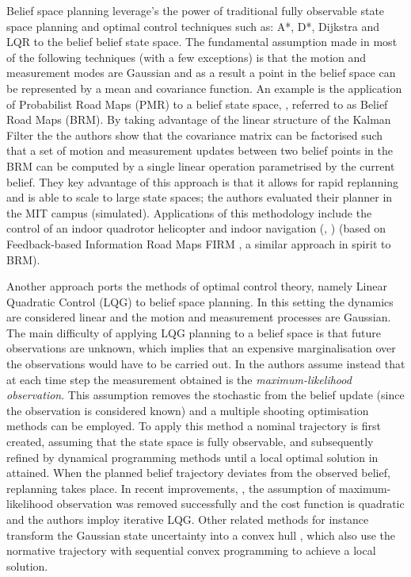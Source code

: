 Belief space planning leverage's the power of traditional fully observable state space 
planning and optimal control techniques such as: A*, D*,  Dijkstra and LQR to the belief belief state space. 
The fundamental assumption made in most of the following techniques (with a few exceptions) is that the 
motion and measurement modes are Gaussian and as a result a point in the belief space can be represented by 
a mean and covariance function.
An example is the application of Probabilist Road Maps (PMR) to a belief state space, \cite{BelRoadMap_2009}, 
referred to as Belief Road Maps (BRM). By taking advantage of the linear structure of the Kalman Filter the 
the authors show that the covariance matrix can be factorised such that a set of  motion and measurement updates between two belief 
points in the BRM can be computed by a single linear operation parametrised by the current belief. They key advantage of this 
approach is that it allows for rapid replanning and is able to scale to large state spaces; the authors evaluated their planner 
in the MIT campus (simulated). Applications of this methodology include the control of an indoor quadrotor helicopter \cite{Quadrator_2008} 
and indoor navigation (\cite{FIRM_2011}, \cite{rob_online_bs_icra_2014}) (based on Feedback-based Information Road Maps FIRM , a similar approach in 
spirit to BRM).

Another approach ports the methods of optimal control theory, namely Linear Quadratic Control (LQG) to belief space planning. In this 
setting the dynamics are considered linear and the motion and measurement processes are Gaussian. The main difficulty of applying
LQG planning to a belief space is that future observations are unknown, which implies that an expensive marginalisation over the observations
would have to be carried out. In \cite{bsp_rss_2010a} the authors assume instead that at each time step the measurement obtained is the 
\textit{maximum-likelihood observation}. This assumption removes the stochastic from the belief update (since the observation is considered known)
and a multiple shooting optimisation methods can be employed. To apply this method a nominal trajectory is first created, assuming that 
the state space is fully observable, and subsequently refined by dynamical programming methods until a local optimal solution in attained.
When the planned belief trajectory deviates from the observed belief, replanning takes place. In recent improvements, \cite{van_den_Berg_2012},  the assumption of 
maximum-likelihood observation was removed successfully and the cost function is quadratic and the authors imploy iterative LQG. Other related methods 
for instance transform the Gaussian state uncertainty into a convex hull \cite{sigma_hull_iros_2013}, which also use the normative trajectory with sequential convex programming 
to achieve a local solution.

